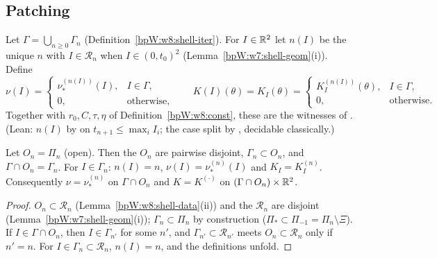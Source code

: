 \subsection{Patching}\label{bpW:w8:patch-sec}

\begin{definition}\label{bpW:w8:patch}
Let $\Gamma=\bigcup_{n\ge0}\Gamma_n$ (Definition~\ref{bpW:w8:shell-iter}). For $I\in\mathbb{R}^2$ let $n(I)$ be the unique $n$ with
$I\in\mathcal R_n$ when $I\in(0,t_0)^2$ (Lemma~\ref{bpW:w7:shell-geom}(i)). Define
\[\nu(I)=\begin{cases}\nu^{(n(I))}_*(I),&I\in\Gamma,\\0,&\text{otherwise},\end{cases}\qquad
K(I)(\theta)=K_I(\theta)=\begin{cases}K^{(n(I))}_I(\theta),&I\in\Gamma,\\0,&\text{otherwise}.\end{cases}\]
Together with $r_0,C,\tau,\eta$ of Definition~\ref{bpW:w8:const}, these are the witnesses of . (Lean: $n(I)$ by
 on $t_{n+1}\le\max_iI_i$; the case split by , decidable classically.)
\end{definition}

\begin{lemma}\label{bpW:w8:patch-local}
Let $O_n=\Pi_n$ (open). Then the $O_n$ are pairwise disjoint, $\Gamma_n\subset O_n$, and $\Gamma\cap O_n=\Gamma_n$. For $I\in\Gamma_n$:
$n(I)=n$, $\nu(I)=\nu^{(n)}_*(I)$ and $K_I=K^{(n)}_I$. Consequently $\nu=\nu^{(n)}_*$ on $\Gamma\cap O_n$ and $K=K^{(\cdot)}$ on
$(\Gamma\cap O_n)\times\mathbb{R}^2$.
\end{lemma}
\begin{proof}
\label{stepW:w8:pl-dis} $O_n\subset\mathcal R_n$ (Lemma~\ref{bpW:w8:shell-data}(ii)) and the $\mathcal R_n$ are disjoint
(Lemma~\ref{bpW:w7:shell-geom}(i)); $\Gamma_n\subset\Pi_n$ by construction ($\Pi_*\subset\Pi_{-1}=\Pi_n\setminus\Xi$).
\label{stepW:w8:pl-id} If $I\in\Gamma\cap O_n$, then $I\in\Gamma_{n'}$ for some $n'$, and $\Gamma_{n'}\subset\mathcal R_{n'}$ meets
$O_n\subset\mathcal R_n$ only if $n'=n$. For $I\in\Gamma_n\subset\mathcal R_n$, $n(I)=n$, and the definitions unfold.
\end{proof}

